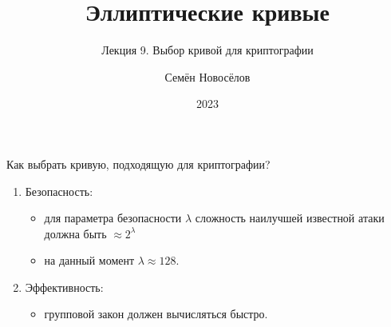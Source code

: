 \documentclass{beamer}
\title{Эллиптические кривые}
\subtitle{Лекция 9. Выбор кривой для криптографии}
\author{Семён Новосёлов}
\institute{БФУ им. И. Канта}
\date{2023}
\begin{document}
\frame{\titlepage}


\begin{frame}{Как выбрать кривую, подходящую для криптографии?}
\begin{enumerate}
    \item Безопасность: 
    
    \vspace{0.3em}
    
    \begin{itemize}
    	\item для параметра безопасности $\lambda$ сложность наилучшей известной атаки должна быть $\approx 2^\lambda$
    	\vspace{0.2em}
    	\item на данный момент $\lambda \approx 128$.
    \end{itemize}
    \vspace{0.2em}
    \item Эффективность: 
    \begin{itemize}
    	\item групповой закон должен вычисляться быстро.
    \end{itemize}
\end{enumerate}
\end{frame}
\end{document}
